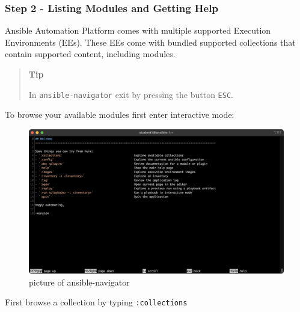 \hypertarget{step-2---listing-modules-and-getting-help}{%
\subsubsection{Step 2 - Listing Modules and Getting
Help}\label{step-2---listing-modules-and-getting-help}}

Ansible Automation Platform comes with multiple supported Execution
Environments (EEs). These EEs come with bundled supported collections
that contain supported content, including modules.

\begin{quote}
\textbf{Tip}

In \texttt{ansible-navigator} exit by pressing the button \texttt{ESC}.
\end{quote}

To browse your available modules first enter interactive mode:

\begin{Shaded}
\begin{Highlighting}[]
\ExtensionTok{$}
\end{Highlighting}
\end{Shaded}

\begin{figure}[H]
\centering
\includegraphics{images/01_interactive-mode.png}
\caption{picture of ansible-navigator}
\end{figure}

First browse a collection by typing \texttt{:collections}

\begin{Shaded}
\begin{Highlighting}[]
\end{Highlighting}
\end{Shaded}

